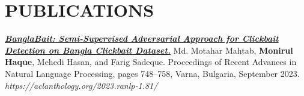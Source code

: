 \documentclass[letterpaper,10.5pt]{article}
\newcommand{\resumeSubHeadingListStart}{\begin{itemize}[leftmargin=0.0in, label={}]}
\newcommand{\resumeSubHeadingListEnd}{\end{itemize}}
\begin{document}

\section{PUBLICATIONS}

\href{https://aclanthology.org/2023.ranlp-1.81/}{\textbf{\emph{\color{NavyBlue} BanglaBait: Semi-Supervised Adversarial Approach for Clickbait Detection on Bangla Clickbait Dataset.}}} Md. Motahar Mahtab, \textbf{Monirul Haque}, Mehedi Hasan, and Farig Sadeque. Proceedings of Recent Advances in Natural Language Processing, pages 748–758, Varna, Bulgaria, September 2023. \emph{https://aclanthology.org/2023.ranlp-1.81/}

\vspace{-6pt}

\end{document}
